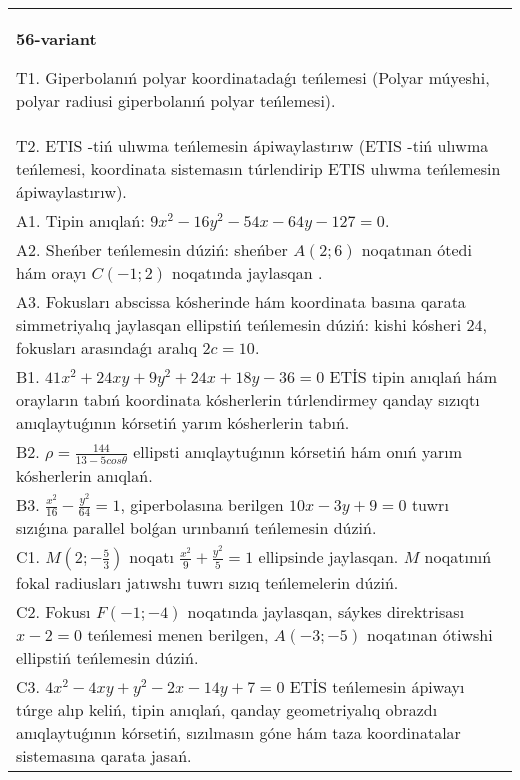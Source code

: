 \documentclass{article}
\begin{document}
\begin{tabular}{m{17cm}}
\textbf{56-variant}
\newline

T1. Giperbolanıń polyar koordinatadaǵı teńlemesi (Polyar múyeshi, polyar radiusi giperbolanıń polyar teńlemesi).\\

T2. ETIS -tiń ulıwma teńlemesin ápiwaylastırıw (ETIS -tiń ulıwma teńlemesi, koordinata sistemasın túrlendirip ETIS ulıwma teńlemesin ápiwaylastırıw).\\

A1. Tipin anıqlań: $9 x^{2}-16 y^{2}-54 x-64 y-127=0$.\\

A2. Sheńber teńlemesin dúziń: sheńber $A (2;6 ) $ noqatınan ótedi hám orayı $C (-1;2) $ noqatında jaylasqan .\\

A3. Fokusları abscissa kósherinde hám koordinata basına qarata simmetriyalıq jaylasqan ellipstiń teńlemesin dúziń: kishi kósheri $24$, fokusları arasındaǵı aralıq $2 c=10$.\\

B1. $41x^{2} + 24xy + 9y^{2} + 24x + 18y - 36 = 0$ ETİS tipin anıqlań hám orayların tabıń koordinata kósherlerin túrlendirmey qanday sızıqtı anıqlaytuǵının kórsetiń yarım kósherlerin tabıń.  \\

B2. $\rho = \frac{144}{13 - 5cos\theta}$ ellipsti anıqlaytuǵının kórsetiń hám onıń yarım kósherlerin anıqlań.\\

B3. $\frac{x^{2}}{16} - \frac{y^{2}}{64} = 1$, giperbolasına berilgen $10x - 3y + 9 = 0$ tuwrı sızıǵına parallel bolǵan urınbanıń teńlemesin dúziń.  \\

C1. $M(2; - \frac{5}{3})$ noqatı $\frac{x^{2}}{9} + \frac{y^{2}}{5} = 1$ ellipsinde jaylasqan. $M$ noqatınıń fokal radiusları jatıwshı tuwrı sızıq teńlemelerin dúziń.  \\

C2. Fokusı $F( - 1; - 4)$ noqatında jaylasqan, sáykes direktrisası $x - 2 = 0$ teńlemesi menen berilgen, $A( - 3; - 5)$ noqatınan ótiwshi ellipstiń teńlemesin dúziń.  \\

C3. $4x^{2} - 4xy + y^{2} - 2x - 14y + 7 = 0$ ETİS teńlemesin ápiwayı túrge alıp keliń, tipin anıqlań, qanday geometriyalıq obrazdı anıqlaytuǵının kórsetiń, sızılmasın góne hám taza koordinatalar sistemasına qarata jasań.  \\

\end{tabular}
\vspace{1cm}
\end{document}
